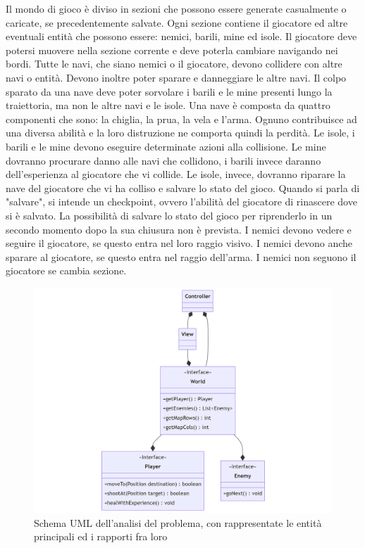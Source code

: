 \documentclass[a4paper,12pt]{report}
\begin{document}
Il mondo di gioco è diviso in sezioni che possono essere generate casualmente o caricate, se precedentemente salvate.
%
Ogni sezione contiene il giocatore ed altre eventuali entità che possono essere: nemici, barili, mine ed isole.
%
Il giocatore deve potersi muovere nella sezione corrente e deve poterla cambiare navigando nei bordi.
%
Tutte le navi, che siano nemici o il giocatore, devono collidere con altre navi o entità.
%
Devono inoltre poter sparare e danneggiare le altre navi.
%
Il colpo sparato da una nave deve poter sorvolare i barili e le mine presenti lungo la traiettoria, ma non le altre navi e le isole.
%
Una nave è composta da quattro componenti che sono: la chiglia, la prua, la vela e l'arma.
%
Ognuno contribuisce ad una diversa abilità e la loro distruzione ne comporta quindi la perdità.
%
Le isole, i barili e le mine devono eseguire determinate azioni alla collisione.
%
Le mine dovranno procurare danno alle navi che collidono, i barili invece daranno dell'esperienza al giocatore che vi collide.
%
Le isole, invece, dovranno riparare la nave del giocatore che vi ha colliso e salvare lo stato del gioco.
%
Quando si parla di "salvare", si intende un checkpoint, ovvero l'abilità del giocatore di rinascere dove si è salvato.
%
La possibilità di salvare lo stato del gioco per riprenderlo in un secondo momento dopo la sua chiusura non è prevista.
%
I nemici devono vedere e seguire il giocatore, se questo entra nel loro raggio visivo.
%
I nemici devono anche sparare al giocatore, se questo entra nel raggio dell'arma.
%
I nemici non seguono il giocatore se cambia sezione.

\begin{figure}[H]
	\centering{}
	\includegraphics[width=1.2\textwidth]{img/Analysis.png}
	\caption{Schema UML dell'analisi del problema, con rappresentate le entità principali ed i rapporti fra loro}
	\label{img:Analysis}
\end{figure}
\end{document}
